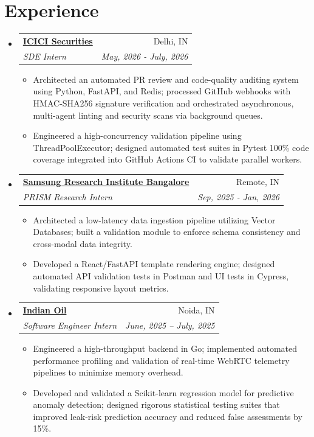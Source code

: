 \documentclass[a4paper,10pt]{extarticle}
\makeatletter
\newcommand{\resumeItemWithoutTitle}[1]{
  \item\normalsize{#1 \vspace{-2pt}}
}
\newcommand{\resumeSubheading}[4]{
  \vspace{-1pt}\item
  \begin{tabular*}{\textwidth}{l@{\extracolsep{\fill}}r}
    \textbf{#1} & #2 \\
    \textit{#3} & \textit{#4} \\
  \end{tabular*}\vspace{-5pt}
}
\newcommand{\resumeSubHeadingListStart}{\begin{itemize}[leftmargin=0in, label={}]}
\newcommand{\resumeSubHeadingListEnd}{\end{itemize}}
\newcommand{\resumeItemListStart}{\vspace{-5pt}\begin{itemize}}
\newcommand{\resumeItemListEnd}{\end{itemize}\vspace{-3pt}}
\makeatother
\begin{document}
\section{Experience}
\resumeSubHeadingListStart
\resumeSubheading{\href{https://www.icicisecurities.com/}{ICICI Securities}}{Delhi, IN}{SDE Intern}{May, 2026 - July, 2026}
\resumeItemListStart
\resumeItemWithoutTitle{Architected an automated PR review and code-quality auditing system using Python, FastAPI, and Redis; processed GitHub webhooks with HMAC-SHA256 signature verification and orchestrated asynchronous, multi-agent linting and security scans via background queues.}
\resumeItemWithoutTitle{Engineered a high-concurrency validation pipeline using ThreadPoolExecutor; designed automated test suites in Pytest 100\% code coverage integrated into GitHub Actions CI to validate parallel workers.}
\resumeItemListEnd
\resumeSubheading{\href{https://www.samsungprism.com/}{Samsung Research Institute Bangalore}}{Remote, IN}{PRISM Research Intern}{Sep, 2025 - Jan, 2026}
\resumeItemListStart
\resumeItemWithoutTitle{Architected a low-latency data ingestion pipeline utilizing Vector Databases; built a validation module to enforce schema consistency and cross-modal data integrity.}
\resumeItemWithoutTitle{Developed a React/FastAPI template rendering engine; designed automated API validation tests in Postman and UI tests in Cypress, validating responsive layout metrics.}
\resumeItemListEnd
\resumeSubheading{\href{https://iocl.com}{Indian Oil}}{Noida, IN}{Software Engineer Intern}{June, 2025 – July, 2025}
\resumeItemListStart
\resumeItemWithoutTitle{Engineered a high-throughput backend in Go; implemented automated performance profiling and validation of real-time WebRTC telemetry pipelines to minimize memory overhead.}
\resumeItemWithoutTitle{Developed and validated a Scikit-learn regression model for predictive anomaly detection; designed rigorous statistical testing suites that improved leak-risk prediction accuracy and reduced false assessments by 15\%.}
\resumeItemListEnd
\resumeSubHeadingListEnd
\end{document}
